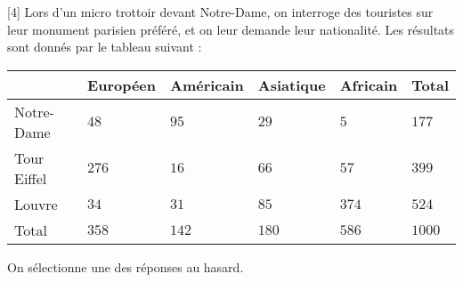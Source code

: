 \documentclass{exam}
\begin{document}
\begin{questions}
\vspace*{1cm}
[4]
Lors d'un micro trottoir devant Notre-Dame, on interroge des touristes sur leur monument parisien préféré, et on leur demande leur nationalité. Les résultats sont donnés par le tableau suivant :
\begin{center}
\begin{tabular}{|*{6}{C{2cm}|}}
\hline\rule{0cm}{1cm}
&Européen&Américain&Asiatique&Africain&Total\\
\hline\rule[-0.4cm]{0cm}{1cm}
Notre-Dame&$48$&$95$&$29$&$5$&$177$\\
\hline\rule[-0.4cm]{0cm}{1cm}
Tour Eiffel&$276$&$16$&$66$&$57$&$399$\\
\hline\rule[-0.4cm]{0cm}{1cm}
Louvre&$34$&$31$&$85$&$374$&$524$\\
\hline\rule[-0.4cm]{0cm}{1cm}
Total&$358$&$142$&$180$&$586$&$1000$\\
\hline
\end{tabular}
\end{center}
On sélectionne une des réponses au hasard.
\end{questions}
\end{document}
